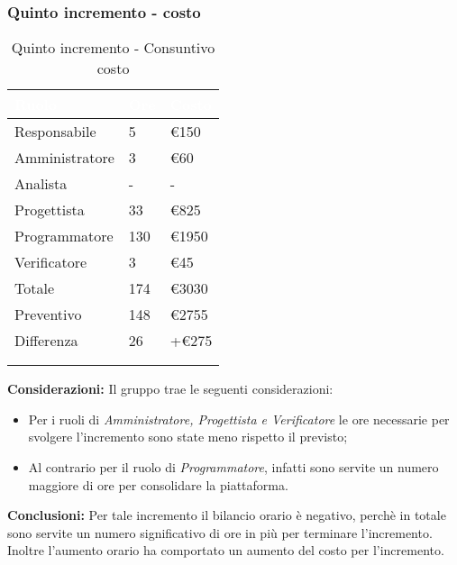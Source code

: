 {            \subsubsection{Quinto incremento - costo} {
                \setlength{\freewidth}{\dimexpr\textwidth-30\tabcolsep}
                \renewcommand{\arraystretch}{1.0}
                \centering
                \setlength{\aboverulesep}{0pt}
                \setlength{\belowrulesep}{0pt}
                \begin{longtable}{C{.4\freewidth} C{.2\freewidth} C{.2\freewidth}}
                \toprule
                \textcolor{white}{\textbf{Ruolo}}&
                \textcolor{white}{\textbf{Ore}}&
                \textcolor{white}{\textbf{Costo}}\\
                \toprule
                \endhead
          
                Responsabile & 5 & \euro150 \\
                Amministratore & 3 & \euro60 \\
                Analista & - & - \\
                Progettista & 33 & \euro825 \\
                Programmatore & 130 & \euro1950 \\
                Verificatore & 3 & \euro45 \\
                Totale & 174 & \euro3030 \\
                Preventivo & 148 & \euro2755 \\
                Differenza & 26 & +\euro275 \\
                \bottomrule
                \\
                \caption{Quinto incremento - Consuntivo costo}
          
                \end{longtable}
                \textbf{Considerazioni:} Il gruppo trae le seguenti considerazioni:
                \begin{itemize}
                    \item Per i ruoli di \textit{Amministratore, Progettista e Verificatore} le ore necessarie per svolgere l'incremento sono state meno rispetto il previsto;
                    \item Al contrario per il ruolo di \textit{Programmatore}, infatti sono servite un numero maggiore di ore per consolidare la piattaforma.
                \end{itemize}
                \textbf{Conclusioni:} Per tale incremento il bilancio orario è negativo, perchè in totale sono servite un numero significativo di ore in più per terminare l'incremento.
                Inoltre l'aumento orario ha comportato un aumento del costo per l'incremento.
            }
}

